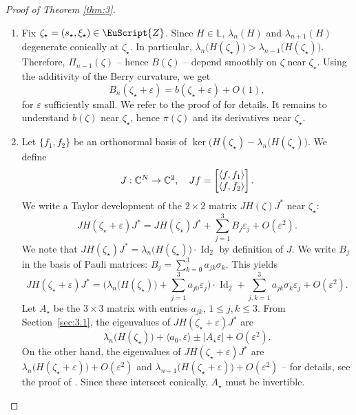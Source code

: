 \documentclass[10pt]{amsart}
\let\pazocal\EuScript
\theoremstyle{definition}
\DeclareMathOperator{\Id}{Id}
\newcommand{\ZZZ}{{\pazocal{Z}}}
\newcommand{\C}{\mathbb{C}}
\newcommand{\Ll}{\mathbb{L}}
\let\epsi\varepsilon
\newcommand{\matrice}[1]{\arraycolsep3.5pt\begin{bmatrix}#1\end{bmatrix}}
\newcommand{\lr}[1]{\langle #1 \rangle}
\begin{document}
\begin{proof}[Proof of Theorem \ref{thm:3}]
\begin{enumerate}
\item
Fix $\zeta_\star = (s_\star,\xi_\star) \in \ZZZ$. Since $H \in \Ll$, $\lambda_n(H)$ and $\lambda_{n+1}(H)$ degenerate conically at $\zeta_\star$. In particular, $\lambda_n\bigl(H(\zeta_\star)\bigr) > \lambda_{n-1}\bigl(H(\zeta_\star)\bigr)$. Therefore, $\Pi_{n-1}(\zeta)$ -- hence $B(\zeta)$ -- depend smoothly on $\zeta$ near $\zeta_\star$.
Using the additivity of the Berry curvature, we get
\begin{equation}\label{eq:0l}
B_n(\zeta_\star+\epsi) = b(\zeta_\star+\epsi) + O(1),
\end{equation}
for $\epsi$ sufficiently small. We refer to the proof of \cite[(2.21)]{D19b} for details. It remains to understand $b(\zeta)$ near $\zeta_\star$, hence $\pi(\zeta)$ and its derivatives near $\zeta_\star$.

\item
Let $\{f_1,f_2\}$ be an orthonormal basis of $\ker\bigl( H(\zeta_\star)-\lambda_n\bigl( H(\zeta_\star) \bigr)$. We define
\begin{equation*}
J : \C^N \to \C^2, \quad Jf = \matrice{\lr{f,f_1} \\ \lr{f,f_2}}.
\end{equation*}
We write a Taylor development of the $2 \times 2$ matrix $J H(\zeta) J^*$ near $\zeta_\star$:
\[
J H(\zeta_\star+\epsi) J^* = J H(\zeta_\star) J^* + \sum_{j=1}^3 B_j \epsi_j + O(\epsi^2).
\]
We note that $J H(\zeta_\star) J^* = \lambda_n\bigl( H(\zeta_\star) \bigr) \cdot \Id_2$ by definition of $J$.
We write $B_j$ in the basis of Pauli matrices: $B_j = \sum_{k=0}^3 a_{jk} \sigma_k$. This yields
\begin{equation}\label{eq:0i}
J H(\zeta_\star+\epsi) J^* = \biggl( \lambda_n\bigl( H(\zeta_\star) \bigr) + \sum_{j=1}^3 a_{j0} \epsi_j \biggr) \cdot \Id_2 + \sum_{j, k=1}^3 a_{jk} \sigma_k \epsi_j + O(\epsi^2).
\end{equation}
Let $A_\star$ be the $3 \times 3$ matrix with entries $a_{jk}$, $1 \leq j,k \leq 3$. From Section~\ref{sec:3.1}, the eigenvalues of $J H(\zeta_\star+\epsi) J^*$ are
\begin{equation}\label{eq:0r}
\lambda_n\bigl( H(\zeta_\star) \bigr) + \lr{a_0,\epsi} \pm |A_\star\epsi| + O(\epsi^2).
\end{equation}
On the other hand, the eigenvalues of $J H(\zeta_\star+\epsi) J^*$ are $\lambda_n\bigl(H(\zeta_\star+\epsi)\bigr) + O(\epsi^2)$ and $\lambda_{n+1}\bigl( H(\zeta_\star+\epsi)\bigr) + O(\epsi^2)$ -- for details, see the proof of \cite[(2.19)]{D19b}. Since these intersect conically, $A_\star$ must be invertible.


\end{enumerate}
\end{proof}
\end{document}
